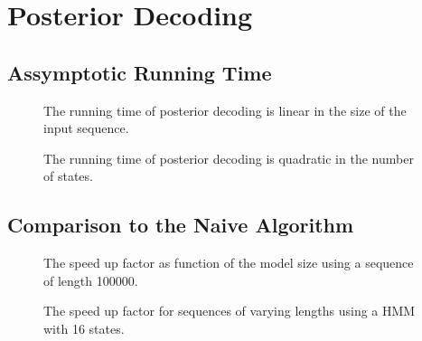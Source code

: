\section{Posterior Decoding}
\label{sec:posterior-decoding}

\subsection{Assymptotic Running Time}
\label{sec:assympt-runn-time}

\begin{figure}[H]
  \centering
  
  \caption{The running time of posterior decoding is linear in the size of the
    input sequence.}
  \label{fig:posterior_n}
\end{figure}

\begin{figure}[H]
  \centering
  
  \caption{The running time of posterior decoding is quadratic in the number of
    states.}
  \label{fig:posterior_k}
\end{figure}

\subsection{Comparison to the Naive Algorithm}
\label{sec:comp-naive-algor}

\begin{figure}[H]
  \centering
  
  \caption{The speed up factor as function of the model size using a sequence
    of length 100000.}
  \label{fig:posterior_speedup_vs_k}
\end{figure}

\begin{figure}[H]
  \centering
  
  \caption{The speed up factor for sequences of varying lengths using a HMM
    with 16 states.}
  \label{fig:posterior_speedup_vs_sequence_length}
\end{figure}

